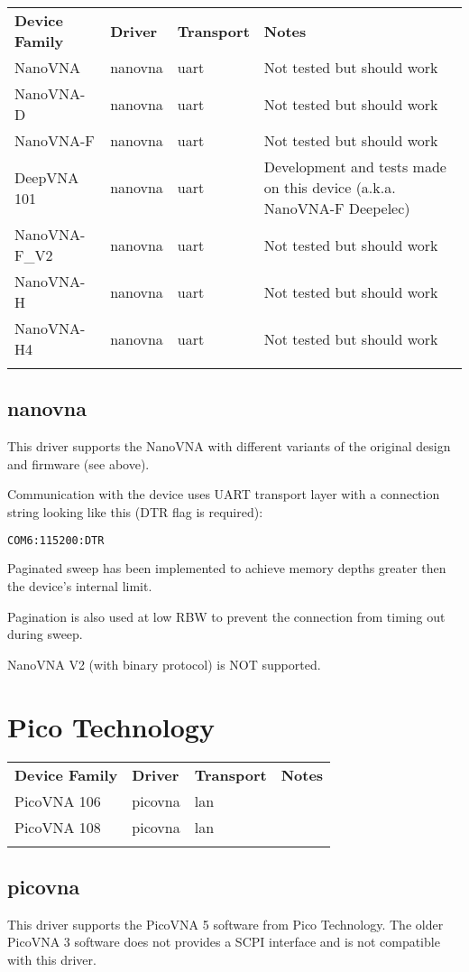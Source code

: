 \begin{tabularx}{16cm}{lllX}
\thickhline
\textbf{Device Family} & \textbf{Driver} & \textbf{Transport} & \textbf{Notes} \\
\thickhline
NanoVNA & nanovna & uart & Not tested but should work\\
\thinhline
NanoVNA-D & nanovna & uart & Not tested but should work\\
\thinhline
NanoVNA-F & nanovna & uart & Not tested but should work\\
\thinhline
DeepVNA 101 & nanovna & uart & Development and tests made on this device (a.k.a. NanoVNA-F Deepelec)\\
\thinhline
NanoVNA-F\_V2 & nanovna & uart & Not tested but should work\\
\thinhline
NanoVNA-H & nanovna & uart & Not tested but should work\\
\thinhline
NanoVNA-H4 & nanovna & uart & Not tested but should work\\
\thickhline
\end{tabularx}

\subsection{nanovna}

This driver supports the NanoVNA with different variants of the original design and firmware (see above).

Communication with the device uses UART transport layer with a connection string looking like this (DTR flag is required):
\begin{lstlisting}[language=sh, numbers=none]
COM6:115200:DTR
\end{lstlisting}

Paginated sweep has been implemented to achieve memory depths greater then the device's internal limit.

Pagination is also used at low RBW to prevent the connection from timing out during sweep.

NanoVNA V2 (with binary protocol) is NOT supported.

\section{Pico Technology}

\begin{tabularx}{16cm}{lllX}
\thickhline
\textbf{Device Family} & \textbf{Driver} & \textbf{Transport} & \textbf{Notes} \\
\thickhline
PicoVNA 106 & picovna & lan & \\
\thinhline
PicoVNA 108 & picovna & lan & \\
\thickhline
\end{tabularx}

\subsection{picovna}

This driver supports the PicoVNA 5 software from Pico Technology. The older PicoVNA 3 software does not provides a SCPI
interface and is not compatible with this driver.
